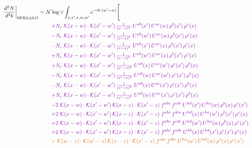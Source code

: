 \documentclass[10pt]{article}
\numberwithin{equation}{section}
\newcommand{\NNv}{\mathcal N\log\vee}
\begin{document}
\begin{align}
\frac{d^3N}{d^3k}\bigg|_{{\rm BFKL}\otimes{\rm LO}}={}&\NNv\int_{x,x',z,w,w'}e^{-ik\cdot(w'-w)}\Bigg[\notag\\
&\quad{\color{CC}+N_c\;\mathcal{K}(x-w)\cdot\mathcal{K}(x'-w')\,\tfrac{1}{(x-z)^{2}}\;U^{ab}(x')\,U^{ac}(w)\,\rho^{b}(x')\,\rho^{c}(x)}\notag\\
&\quad{\color{CC}-N_c\;\mathcal{K}(x-w)\cdot\mathcal{K}(x'-w')\,\tfrac{1}{(x-z)^{2}}\;U^{ab}(w')\,U^{ac}(w)\,\rho^{b}(x')\,\rho^{c}(x)}\notag\\
&\quad{\color{CC}-N_c\;\mathcal{K}(x-w)\cdot\mathcal{K}(x'-w')\,\tfrac{1}{(x-z)^{2}}\;U^{ab}(x')\,U^{ac}(x)\,\rho^{b}(x')\,\rho^{c}(x)}\notag\\
&\quad{\color{CC}+N_c\;\mathcal{K}(x-w)\cdot\mathcal{K}(x'-w')\,\tfrac{1}{(x-z)^{2}}\;U^{ab}(w')\,U^{ac}(x)\,\rho^{b}(x')\,\rho^{c}(x)}\notag\\
&\quad{\color{CC}+N_c\;\mathcal{K}(x-w)\cdot\mathcal{K}(x'-w')\,\tfrac{1}{(x'-z)^{2}}\;U^{ab}(x)\,U^{ac}(w')\,\rho^{c}(x')\,\rho^{b}(x)}\notag\\
&\quad{\color{CC}-N_c\;\mathcal{K}(x-w)\cdot\mathcal{K}(x'-w')\,\tfrac{1}{(x'-z)^{2}}\;U^{ab}(w)\,U^{ac}(w')\,\rho^{c}(x')\,\rho^{b}(x)}\notag\\
&\quad{\color{CC}-N_c\;\mathcal{K}(x-w)\cdot\mathcal{K}(x'-w')\,\tfrac{1}{(x'-z)^{2}}\;U^{ab}(x)\,U^{ac}(x')\,\rho^{c}(x')\,\rho^{b}(x)}\notag\\
&\quad{\color{CC}+N_c\;\mathcal{K}(x-w)\cdot\mathcal{K}(x'-w')\,\tfrac{1}{(x'-z)^{2}}\;U^{ab}(w)\,U^{ac}(x')\,\rho^{c}(x')\,\rho^{b}(x)}\notag\\
&\quad{\color{CC}-2\;\mathcal{K}(x-w)\cdot\mathcal{K}(x'-w')\,\mathcal{K}(x-z)\cdot\mathcal{K}(x'-z)\;f^{abc}\,f^{cde}\,U^{hd}(x')\,U^{ha}(w)\,\rho^{b}(x)\,\rho^{e}(x')}\notag\\
&\quad{\color{CC}+2\;\mathcal{K}(x-w)\cdot\mathcal{K}(x'-w')\,\mathcal{K}(x-z)\cdot\mathcal{K}(x'-z)\;f^{abc}\,f^{dce}\,U^{hd}(x)\,U^{ha}(w')\,\rho^{b}(x')\,\rho^{e}(x)}\notag\\
&\quad{\color{CC}+2\;\mathcal{K}(x-w)\cdot\mathcal{K}(x'-w')\,\mathcal{K}(x-z)\cdot\mathcal{K}(x'-z)\;f^{abc}\,f^{cde}\,U^{hd}(w')\,U^{ha}(w)\,\rho^{b}(x)\,\rho^{e}(x')}\notag\\
&\quad{\color{CC}+2\;\mathcal{K}(x-w)\cdot\mathcal{K}(x'-w')\,\mathcal{K}(x-z)\cdot\mathcal{K}(x'-z)\;f^{abc}\,f^{ade}\,U^{hb}(x)\,U^{hd}(x')\,\rho^{e}(x')\,\rho^{c}(x)}\notag\\
&\quad{\color{BFK}+\;\mathcal{K}(w-z)\cdot\mathcal{K}(w'-z)\,\mathcal{K}(x-z)\cdot\mathcal{K}(x'-z)\;f^{abc}\,f^{dbe}\,U^{ha}(w')\,U^{hd}(w)\,\rho^{c}(x)\,\rho^{e}(x')}\notag\\

\end{align}
\end{document}
